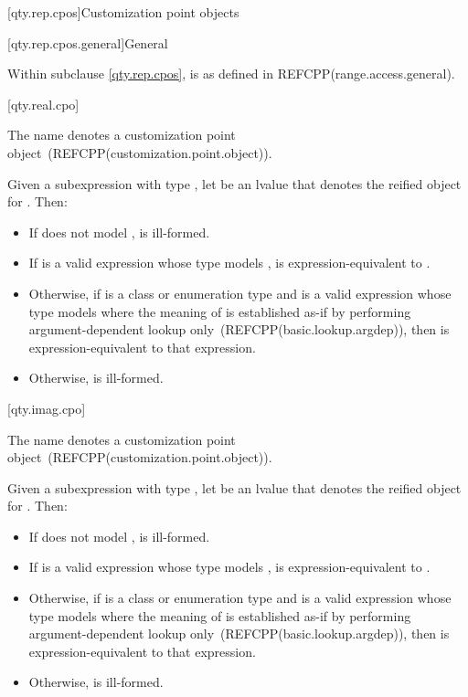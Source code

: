 [qty.rep.cpos]{Customization point objects}

[qty.rep.cpos.general]{General}

\pnum
Within subclause \ref{qty.rep.cpos},
 is as defined in REFCPP(range.access.general).

[qty.real.cpo]{}

\pnum
The name  denotes a customization point object~(REFCPP(customization.point.object)).

\pnum
Given a subexpression  with type ,
let  be an lvalue that denotes the reified object for .
Then:
\begin{itemize}
\item
If  does not model ,
 is ill-formed.
\item
If  is a valid expression whose type models ,
 is expression-equivalent to .
\item
Otherwise, if  is a class or enumeration type and
 is a valid expression whose type models 
where the meaning of  is established as-if by performing argument-dependent lookup only~(REFCPP(basic.lookup.argdep)),
then  is expression-equivalent to that expression.
\item
Otherwise,  is ill-formed.
\end{itemize}

[qty.imag.cpo]{}

\pnum
The name  denotes a customization point object~(REFCPP(customization.point.object)).

\pnum
Given a subexpression  with type ,
let  be an lvalue that denotes the reified object for .
Then:
\begin{itemize}
\item
If  does not model ,
 is ill-formed.
\item
If  is a valid expression whose type models ,
 is expression-equivalent to .
\item
Otherwise, if  is a class or enumeration type and
 is a valid expression whose type models 
where the meaning of  is established as-if by performing argument-dependent lookup only~(REFCPP(basic.lookup.argdep)),
then  is expression-equivalent to that expression.
\item
Otherwise,  is ill-formed.
\end{itemize}

